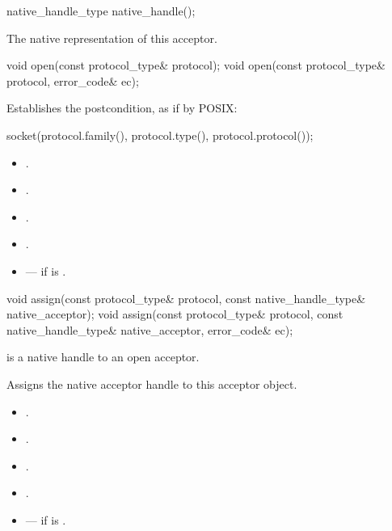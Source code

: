 \begin{itemdecl}
native_handle_type native_handle();
\end{itemdecl}

\begin{itemdescr}
\pnum
\returns The native representation of this acceptor.
\end{itemdescr}

\begin{itemdecl}
void open(const protocol_type& protocol);
void open(const protocol_type& protocol, error_code& ec);
\end{itemdecl}

\begin{itemdescr}
\pnum
\effects Establishes the postcondition, as if by POSIX:
\begin{codeblock}
socket(protocol.family(), protocol.type(), protocol.protocol());
\end{codeblock}

\pnum
\postconditions
\begin{itemize}
\item
{}.
\item
{}.
\item
{}.
\item
{}.
\end{itemize}

\pnum
\errors
\begin{itemize}
\item
{} --- if  is .
\end{itemize}
\end{itemdescr}

\begin{itemdecl}
void assign(const protocol_type& protocol,
            const native_handle_type& native_acceptor);
void assign(const protocol_type& protocol,
            const native_handle_type& native_acceptor, error_code& ec);
\end{itemdecl}

\begin{itemdescr}
\pnum
\expects {} is a native handle to an open acceptor.

\pnum
\effects Assigns the native acceptor handle to this acceptor object.

\pnum
\postconditions
\begin{itemize}
\item
{}.
\item
{}.
\item
{}.
\item
{}.
\end{itemize}

\pnum
\errors
\begin{itemize}
\item
{} --- if  is .
\end{itemize}
\end{itemdescr}

